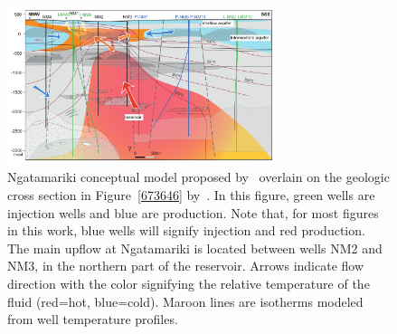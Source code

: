 \begin{figure}
\begin{center}
\includegraphics[width=0.7\textwidth,height=0.7\textheight,keepaspectratio]{Chapter_1_Intro/figures/Chamerfort_2015_fig9_model/Chamberfort_2015_fig9_model_original}
\caption{{Ngatamariki conceptual model proposed by~\protect\citet{Boseley_2010} overlain on
the geologic cross section in Figure~{\ref{673646}}
by~\protect\citet{Chambefort_2016}. In this figure, green wells are injection wells
and blue are production. Note that, for most figures in this work, blue
wells will signify injection and red production. The main upflow at
Ngatamariki is located between wells NM2 and NM3, in the northern part
of the reservoir. Arrows indicate flow direction with the color
signifying the relative temperature of the fluid (red=hot, blue=cold).
Maroon lines are isotherms modeled from well temperature profiles.
{\label{813462}}%
}}
\end{center}
\end{figure}


